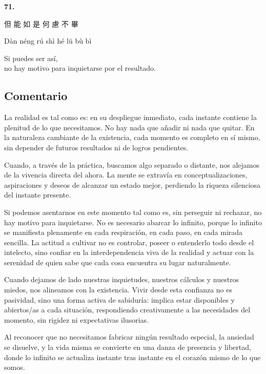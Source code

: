 \documentclass[
  a5paperpaper,
]{article}
\begin{document}
\begin{verseblock}

\newpage

\begin{center}\textbf{71.}\end{center}

但 能 如 是 何 慮 不 畢

Dàn néng rú shì hé lü bù bì

Si puedes ser así,\\
no hay motivo para inquietarse por el resultado.

\end{verseblock}

\hfill\break

\hypertarget{comentario-70}{%
\subsection{Comentario}\label{comentario-70}}

La realidad es tal como es: en su despliegue inmediato, cada instante
contiene la plenitud de lo que necesitamos. No hay nada que añadir ni
nada que quitar. En la naturaleza cambiante de la existencia, cada
momento es completo en sí mismo, sin depender de futuros resultados ni
de logros pendientes.

Cuando, a través de la práctica, buscamos algo separado o distante, nos
alejamos de la vivencia directa del ahora. La mente se extravía en
conceptualizaciones, aspiraciones y deseos de alcanzar un estado mejor,
perdiendo la riqueza silenciosa del instante presente.

Si podemos asentarnos en este momento tal como es, sin perseguir ni
rechazar, no hay motivo para inquietarse. No es necesario abarcar lo
infinito, porque lo infinito se manifiesta plenamente en cada
respiración, en cada paso, en cada mirada sencilla. La actitud a
cultivar no es controlar, poseer o entenderlo todo desde el intelecto,
sino confiar en la interdependencia viva de la realidad y actuar con la
serenidad de quien sabe que cada cosa encuentra su lugar naturalmente.

Cuando dejamos de lado nuestras inquietudes, nuestros cálculos y
nuestros miedos, nos alineamos con la existencia. Vivir desde esta
confianza no es pasividad, sino una forma activa de sabiduría: implica
estar disponibles y abiertos/as a cada situación, respondiendo
creativamente a las necesidades del momento, sin rigidez ni expectativas
ilusorias.

Al reconocer que no necesitamos fabricar ningún resultado especial, la
ansiedad se disuelve, y la vida misma se convierte en una danza de
presencia y libertad, donde lo infinito se actualiza instante tras
instante en el corazón mismo de lo que somos.
\end{document}
